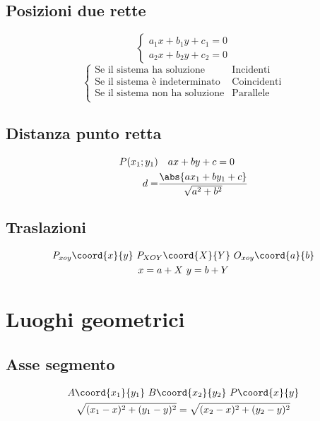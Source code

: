 \section{Posizioni due rette}
\begin{equation}
\begin{cases}
a_1x+b_1y+c_1=0\\
a_2x+b_2y+c_2=0
\end{cases}
\end{equation}
\begin{equation}
\begin{cases}
\text{Se il sistema ha soluzione}& \text{Incidenti}\\
\text{Se il sistema è indeterminato}& \text{Coincidenti}\\
\text{Se il sistema non ha soluzione}& \text{Parallele}\\
\end{cases}
\end{equation}
\section{Distanza punto retta}
\begin{align}
P(x_1;y_1)&\quad ax+by+c=0\\
d=&\dfrac{\abs{ax_1+by_1+c}}{\sqrt{a^2+b^2}}
\end{align}
\section{Traslazioni}
\begin{gather}
 P_{xoy}\coord{x}{y}\ P_{XOY}\coord{X}{Y}\ O_{xoy}\coord{a}{b}\notag\\  x=a+X\  y=b+Y
\end{gather}
\chapter{Luoghi geometrici}
\section{Asse segmento}
\begin{gather}
A\coord{x_1}{y_1}\ B\coord{x_2}{y_2}\ P\coord{x}{y}\notag\\
\sqrt{(x_1-x)^2+(y_1-y)^2}=\sqrt{(x_2-x)^2+(y_2-y)^2}
\end{gather}
